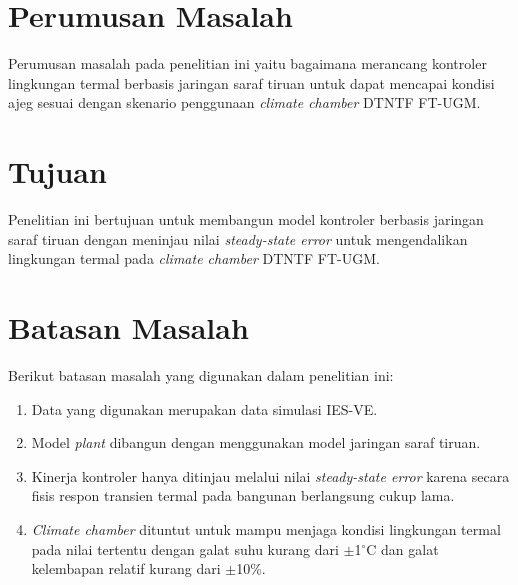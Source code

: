 
\section{Perumusan Masalah}
Perumusan masalah pada penelitian ini yaitu bagaimana merancang kontroler lingkungan termal berbasis jaringan saraf tiruan untuk dapat mencapai kondisi ajeg sesuai dengan skenario penggunaan \textit{climate chamber} DTNTF FT-UGM.

\section{Tujuan}
Penelitian ini bertujuan untuk membangun model kontroler berbasis jaringan saraf tiruan dengan meninjau nilai \textit{steady-state error} untuk mengendalikan lingkungan termal pada \textit{climate chamber} DTNTF FT-UGM.

\section{Batasan Masalah}
Berikut batasan masalah yang digunakan dalam penelitian ini:
\begin{enumerate}
	\item Data yang digunakan merupakan data simulasi IES-VE.
	\item Model \textit{plant} dibangun dengan menggunakan model jaringan saraf tiruan.
	\item Kinerja kontroler hanya ditinjau melalui nilai \textit{steady-state error} karena secara fisis respon transien termal pada bangunan berlangsung cukup lama.
	\item \textit{Climate chamber} dituntut untuk mampu menjaga kondisi lingkungan termal pada nilai tertentu dengan galat suhu kurang dari $\pm$1$^{\circ}$C dan galat kelembapan relatif kurang dari $\pm$10\%.
\end{enumerate}

